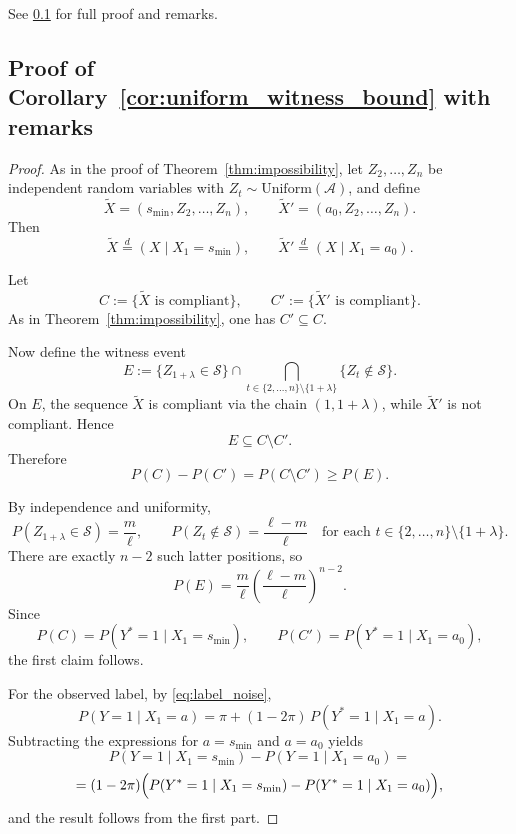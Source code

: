 \documentclass{article}
\theoremstyle{plain}
\theoremstyle{definition}
\theoremstyle{remark}
\begin{document}
See \ref{appendix:proof_uniform_witness_bound} for full proof and remarks.




\subsection{Proof of Corollary~\ref{cor:uniform_witness_bound} with remarks}
\label{appendix:proof_uniform_witness_bound}
\begin{proof}
As in the proof of Theorem~\ref{thm:impossibility}, let
$Z_2,\ldots,Z_n$ be independent random variables with
$Z_t\sim \mathrm{Uniform}(\mathcal{A})$, and define
\[
\widetilde X=(s_{\min},Z_2,\ldots,Z_n),
\qquad
\widetilde X'=(a_0,Z_2,\ldots,Z_n).
\]
Then
\[
\widetilde X \stackrel{d}{=} (X\mid X_1=s_{\min}),
\qquad
\widetilde X' \stackrel{d}{=} (X\mid X_1=a_0).
\]

Let
\[
C:=\{\widetilde X \text{ is compliant}\},
\qquad
C':=\{\widetilde X' \text{ is compliant}\}.
\]
As in Theorem~\ref{thm:impossibility}, one has $C'\subseteq C$.

Now define the witness event
\[
E
:=
\{Z_{1+\lambda}\in\mathcal{S}\}
\cap
\bigcap_{t\in\{2,\ldots,n\}\setminus\{1+\lambda\}}
\{Z_t\notin\mathcal{S}\}.
\]
On $E$, the sequence $\widetilde X$ is compliant via the chain
$(1,1+\lambda)$, while $\widetilde X'$ is not compliant. Hence
\[
E \subseteq C\setminus C'.
\]
Therefore
\[
P(C)-P(C') = P(C\setminus C') \ge P(E).
\]

By independence and uniformity,
\[
P(Z_{1+\lambda}\in\mathcal{S})=\frac{m}{\ell},
\qquad
P(Z_t\notin\mathcal{S})=\frac{\ell-m}{\ell}
\quad
\text{for each } t\in\{2,\ldots,n\}\setminus\{1+\lambda\}.
\]
There are exactly $n-2$ such latter positions, so
\[
P(E)
=
\frac{m}{\ell}\left(\frac{\ell-m}{\ell}\right)^{n-2}.
\]
Since
\[
P(C)=P(Y^*=1\mid X_1=s_{\min}),
\qquad
P(C')=P(Y^*=1\mid X_1=a_0),
\]
the first claim follows.

For the observed label, by \eqref{eq:label_noise},
\[
P(Y=1\mid X_1=a)
=
\pi + (1-2\pi)\,P(Y^*=1\mid X_1=a).
\]
Subtracting the expressions for $a=s_{\min}$ and $a=a_0$ yields
\[
P(Y=1\mid X_1=s_{\min})
-
P(Y=1\mid X_1=a_0)
=
\]
\[
= (1-2\pi)\Bigl(
P(Y^*=1\mid X_1=s_{\min})
-
P(Y^*=1\mid X_1=a_0)
\Bigr),
\]
and the result follows from the first part.
\end{proof}
\end{document}
